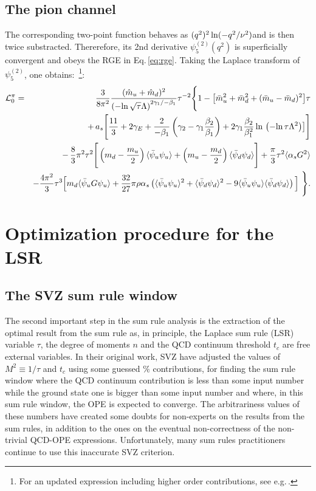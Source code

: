 \documentclass[aps,prd,groupedaddress,nofootinbib]{revtex4-1}
\def\bea{\begin{eqnarray}}
\def\eea{\end{eqnarray}}
\def\nnb{\nonumber}
\def\ga{\left(}
\def\dr{\right)}
\def\nnb{\nonumber}
\def\la{\langle}
\def\ra{\rangle}
\begin{document}
\subsection{The pion channel}
The corresponding two-point function behaves as $(q^2)^2\, {\rm ln}(-q^2/\nu^2)$and is then twice substracted. Thererefore, its 2nd derivative $\psi_5^{(2)}(q^2)$ is superficially convergent and obeys
the RGE in Eq.\,\ref{eq:rge}. Taking the Laplace transform of $\psi_5^{(2)}$, one obtains:
\cite{SNR,SNB1,SNB2}\,\footnote{For an updated expression including higher order contributions, see e.g.\,\cite{SNLIGHT}.}:
\bea
{\cal L}_0^{\pi}&=&\frac{3}{8\pi^2}\frac{(\hat m_u+\hat m_d)^2}
{\ga-\rm{ln}\,\sqrt{\tau}\Lambda\dr^{2\gamma_1/-\beta_1}}\tau^{-2}
\Bigg{\{}1-\big{[} \bar m_u^2+\bar m_d^2+(\bar m_u-\bar m_d)^2\big{]}\tau\nnb\\
&&+\,a_s\Bigg{[} \frac{11}{3}+2\gamma_E+ \frac{2}{-\beta_1}\ga \gamma_2-\gamma_1\frac{\beta_2}{\beta_1}\dr +2\gamma_1\frac{\beta_2 }{\beta_1^2}\,{\rm ln\,\ga -ln\,\tau\Lambda^2\dr}       \big{]}  \Bigg{]}\nnb\\
&&-\,\frac{8}{3}\pi^2\tau^2\Bigg{[} \ga m_d-\frac{m_u}{2}\dr \la\bar \psi_u\psi_u\ra 
+ \ga m_u-\frac{m_d}{2}\dr \la\bar \psi_d\psi_d\ra \Bigg{]}+\frac{\pi}{3}\tau^2\la\alpha_s G^2\ra\nnb\\
&&-\frac{4\pi^2}{3}\tau^3\Big{[} m_d\la\bar \psi_uG\psi_u\ra  +
\frac{32}{27}\pi \rho\alpha_s\ga \la\bar \psi_u\psi_u\ra^2+\la\bar \psi_d\psi_d\ra^2-9 
\la\bar \psi_u\psi_u\ra \la\bar \psi_d\psi_d\ra    \dr\Big{]}~
\Bigg{\}}.
\eea
\section {Optimization procedure for the LSR}
\subsection{The SVZ sum rule window}
The second important step in the sum rule analysis is the extraction of the optimal result from the sum rule as, in principle, the Laplace sum rule (LSR) variable $\tau$, the degree of moments $n$ and the QCD continuum threshold $t_c$ are free external variables. In their original work,  SVZ have adjusted the values of $M^2\equiv 1/\tau$ and $t_c$ using some guessed $\%$ contributions, for finding the sum rule window where the QCD continuum contribution is less than some input number while the ground state one is bigger than some input number and where,  in this sum rule window, the OPE is expected to converge.  The arbitrariness values of these numbers have created some doubts for non-experts on the results from the sum rules, in addition to the ones on the eventual non-correctness of the non-trivial QCD-OPE expressions. Unfortunately, many sum rules practitioners continue to use this inaccurate SVZ criterion. 
\end{document}
